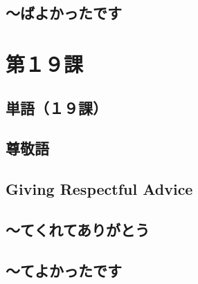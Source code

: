 \documentclass[notoc,notitlepage]{tufte-book}
\begin{document}
\section{〜ばよかったです}%
\label{sec:_bayokatsutadesu}





\chapter{第１９課}%
\label{chp:dai_19_ka}

\section{単語（１９課）}%
\label{sec:tango_c19}




\section{尊敬語}%
\label{sec:sonkeigo}




\section{Giving Respectful Advice}%
\label{sec:giving_respectful_advice}




\section{〜てくれてありがとう}%
\label{sec:_tekuretearigatou}




\section{〜てよかったです}%
\label{sec:_teyokatsutadesu}
\end{document}
